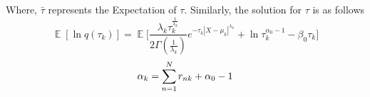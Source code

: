 \documentclass[conference]{IEEEtran}
\begin{document}
   
    
Where, $\bar{\tau}$ represents the Expectation of $\tau$.
Similarly, the solution for $\tau$ is as follows
    \begin{equation}
        \mathop{\mathbb{E}}[\ln q(\tau_k)] = \mathop{\mathbb{E}}\bigg[\frac{\lambda_k \tau_k^{\frac{1}{\lambda_k}}}{2\Gamma(\frac{1}{\lambda_k})} e ^ {-\tau_k |X-\mu_k|^{\lambda_k}} + \ln\tau_k^{\alpha_0 - 1} - \beta_0 \tau_k\bigg]
    \end{equation}
    \begin{equation}
        \begin{split}\label{alphak}
            \alpha_k = \sum_{\mathclap{n=1}}^{N} r_{nk} + \alpha_0 - 1
        \end{split}
    \end{equation}
    
\end{document}
